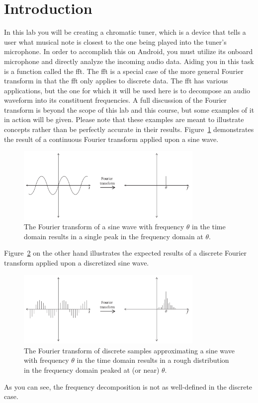 \section{Introduction}

In this lab you will be creating a chromatic tuner, which is a device that tells a user what musical note is closest to the one being played into the tuner's microphone.
In order to accomplish this on Android, you must utilize its onboard microphone and directly analyze the incoming audio data.
Aiding you in this task is a function called the \ac{fft}.
The \ac{fft} is a special case of the more general Fourier transform in that the \ac{fft} only applies to discrete data.
The \ac{fft} has various applications, but the one for which it will be used here is to decompose an audio waveform into its constituent frequencies.
A full discussion of the Fourier transform is beyond the scope of this lab and this course, but some examples of it in action will be given.
Please note that these examples are meant to illustrate concepts rather than be perfectly accurate in their results.
Figure~\ref{fig:cft} demonstrates the result of a continuous Fourier transform applied upon a sine wave.
\begin{figure}[h]
\centering
\includegraphics[width=0.8\textwidth]{CFT.pdf}
\caption{The Fourier transform of a sine wave with frequency $\theta$ in the time domain results in a single peak in the frequency domain at $\theta$.}
\label{fig:cft}
\end{figure}
Figure~\ref{fig:dft} on the other hand illustrates the expected results of a discrete Fourier transform applied upon a discretized sine wave.
\begin{figure}[h]
\centering
\includegraphics[width=0.8\textwidth]{DFT.pdf}
\caption{The Fourier transform of discrete samples approximating a sine wave with frequency $\theta$ in the time domain results in a rough distribution in the frequency domain peaked at (or near) $\theta$.}
\label{fig:dft}
\end{figure}
As you can see, the frequency decomposition is not as well-defined in the discrete case.